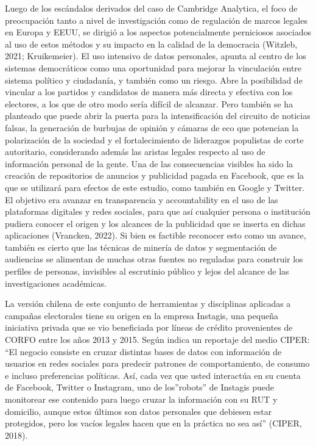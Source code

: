 \documentclass[
  10pt,
  letterpaper,
]{report}
\begin{document}
Luego de los escándalos derivados del caso de Cambridge Analytica, el
foco de preocupación tanto a nivel de investigación como de regulación
de marcos legales en Europa y EEUU, se dirigió a los aspectos
potencialmente perniciosos asociados al uso de estos métodos y su
impacto en la calidad de la democracia (Witzleb, 2021; Kruikemeier). El
uso intensivo de datos personales, apunta al centro de los sistemas
democráticos como una oportunidad para mejorar la vinculación entre
sistema político y ciudadanía, y también como un riesgo. Abre la
posibilidad de vincular a los partidos y candidatos de manera más
directa y efectiva con los electores, a los que de otro modo sería
difícil de alcanzar. Pero también se ha planteado que puede abrir la
puerta para la intensificación del circuito de noticias falsas, la
generación de burbujas de opinión y cámaras de eco que potencian la
polarización de la sociedad y el fortalecimiento de liderazgos
populistas de corte autoritario, considerando además las aristas legales
respecto al uso de información personal de la gente. Una de las
consecuencias visibles ha sido la creación de repositorios de anuncios y
publicidad pagada en Facebook, que es la que se utilizará para efectos
de este estudio, como también en Google y Twitter. El objetivo era
avanzar en transparencia y accountability en el uso de las plataformas
digitales y redes sociales, para que así cualquier persona o institución
pudiera conocer el origen y los alcances de la publicidad que se inserta
en dichas aplicaciones (Vrancken, 2022). Si bien es factible reconocer
esto como un avance, también es cierto que las técnicas de minería de
datos y segmentación de audiencias se alimentan de muchas otras fuentes
no reguladas para construir los perfiles de personas, invisibles al
escrutinio público y lejos del alcance de las investigaciones
académicas.

La versión chilena de este conjunto de herramientas y disciplinas
aplicadas a campañas electorales tiene su origen en la empresa Instagis,
una pequeña iniciativa privada que se vio beneficiada por líneas de
crédito provenientes de CORFO entre los años 2013 y 2015. Según indica
un reportaje del medio CIPER: ``El negocio consiste en cruzar distintas
bases de datos con información de usuarios en redes sociales para
predecir patrones de comportamiento, de consumo e incluso preferencias
políticas. Así, cada vez que usted interactúa en su cuenta de Facebook,
Twitter o Instagram, uno de los''robots'' de Instagis puede monitorear
ese contenido para luego cruzar la información con su RUT y domicilio,
aunque estos últimos son datos personales que debiesen estar protegidos,
pero los vacíos legales hacen que en la práctica no sea así'' (CIPER,
2018).
\end{document}
